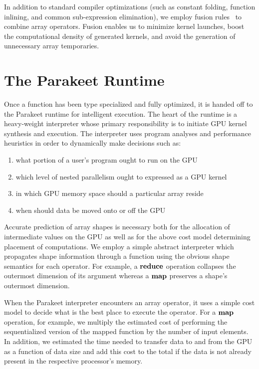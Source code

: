 \documentclass[10pt,twocolumn]{article}
\begin{document}
In addition to standard compiler optimizations (such as constant folding, function inlining, and common sub-expression elimination), we employ fusion rules~\cite{Jones01} to combine array operators. Fusion enables us to minimize kernel launches, boost the computational density of generated kernels, and avoid the generation of unnecessary array temporaries.

\section{The Parakeet Runtime}
\label{runtime}

Once a function has been type specialized and fully optimized, it is handed off to the Parakeet runtime for intelligent execution. The heart of the runtime is a heavy-weight interpreter whose primary responsibility is to initiate GPU kernel synthesis and execution. The interpreter uses program analyses and performance heuristics in order to dynamically make decisions such as: 
\begin{enumerate}
\item what portion of a user's program ought to run on the GPU 
\item which level of nested parallelism ought to expressed as a GPU kernel
\item in which GPU memory space should a particular array reside 
\item when should data be moved onto or off the GPU
\end{enumerate} 

Accurate prediction of array shapes is necessary both for the allocation of intermediate values on the GPU as well as for the above cost model determining placement of computations. We employ a simple abstract interpreter which propagates shape information through a function using the obvious shape semantics for each operator. For example, a $\mbox{\textbf{reduce}}$ operation collapses the outermost dimension of its argument whereas a $\mbox{\textbf{map}}$ preserves a shape's outermost dimension.

When the Parakeet interpreter encounters an array operator, it uses a simple cost model to decide what is the best place to execute the operator.  For a $\mbox{\textbf{map}}$ operation, for example, we multiply the estimated cost of performing the sequentialized version of the mapped function by the number of input elements. In addition, we estimated the time needed to transfer data to and from the GPU as a function of data size and add this cost to the total if the data is not already present in the respective processor's memory.
\end{document}
